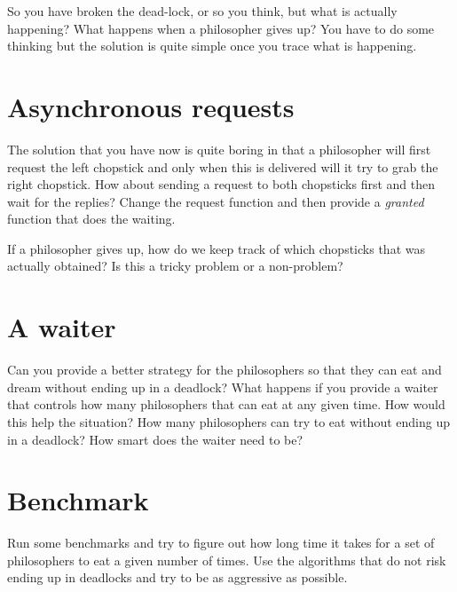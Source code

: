 \documentclass[a4paper,11pt]{article}
\begin{document}
So you have broken the dead-lock, or so you think, but what is
actually happening? What happens when a philosopher gives up? You have
to do some thinking but the solution is quite simple once you trace
what is happening.



\section{Asynchronous requests}

The solution that you have now is quite boring in that a philosopher
will first request the left chopstick and only when this is delivered
will it try to grab the right chopstick. How about sending a request
to both chopsticks first and then wait for the replies? Change the
request function and then provide a {\em granted} function that does
the waiting. 

If a philosopher gives up, how do we keep track of which chopsticks
that was actually obtained? Is this a tricky problem or a non-problem?



\section{A waiter}

Can you provide a better strategy for the philosophers so that they
can eat and dream without ending up in a deadlock? What happens if
you provide a waiter that controls how many philosophers that can eat
at any given time. How would this help the situation? How many
philosophers can try to eat without ending up in a deadlock? How
smart does the waiter need to be?



\section{Benchmark}

Run some benchmarks and try to figure out how long time it takes for a
set of philosophers to eat a given number of times. Use the algorithms
that do not risk ending up in deadlocks and try to be as aggressive as
possible.  
\end{document}
